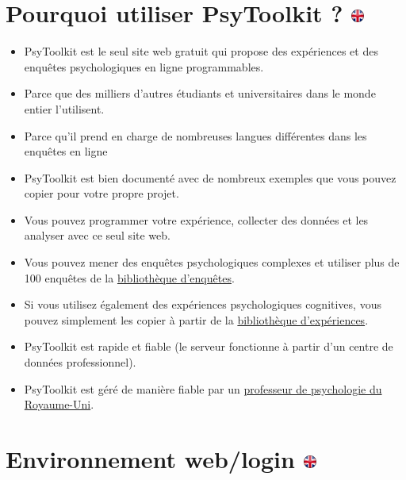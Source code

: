 \documentclass[
]{book}
\providecommand{\tightlist}{%
  \setlength{\itemsep}{0pt}\setlength{\parskip}{0pt}}
\begin{document}
\hypertarget{pourquoi-utiliser-psytoolkit}{%
\section[Pourquoi utiliser PsyToolkit ? ]{\texorpdfstring{Pourquoi
utiliser PsyToolkit ?
\href{https://www.psytoolkit.org/\#_why_use_psytoolkit}{\protect\includegraphics{img/ukflag.png}}}{Pourquoi utiliser PsyToolkit ? }}\label{pourquoi-utiliser-psytoolkit}}

\begin{itemize}
\tightlist
\item
  PsyToolkit est le seul site web gratuit qui propose des expériences et
  des enquêtes psychologiques en ligne programmables.
\item
  Parce que des milliers d'autres étudiants et universitaires dans le
  monde entier l'utilisent.
\item
  Parce qu'il prend en charge de nombreuses langues différentes dans les
  enquêtes en ligne
\item
  PsyToolkit est bien documenté avec de nombreux exemples que vous
  pouvez copier pour votre propre projet.
\item
  Vous pouvez programmer votre expérience, collecter des données et les
  analyser avec ce seul site web.
\item
  Vous pouvez mener des enquêtes psychologiques complexes et utiliser
  plus de 100 enquêtes de la
  \href{https://www.psytoolkit.org/survey-library}{bibliothèque
  d'enquêtes}.
\item
  Si vous utilisez également des expériences psychologiques cognitives,
  vous pouvez simplement les copier à partir de la
  \href{https://www.psytoolkit.org/experiment-library}{bibliothèque
  d'expériences}.
\item
  PsyToolkit est rapide et fiable (le serveur fonctionne à partir d'un
  centre de données professionnel).
\item
  PsyToolkit est géré de manière fiable par un
  \href{https://www.psytoolkit.org/contact.html}{professeur de
  psychologie du Royaume-Uni}.
\end{itemize}

\hypertarget{environnement-weblogin}{%
\section[Environnement web/login ]{\texorpdfstring{Environnement
web/login
\href{https://www.psytoolkit.org/\#_web_based_login}{\protect\includegraphics{img/ukflag.png}}}{Environnement web/login }}\label{environnement-weblogin}}
\end{document}

